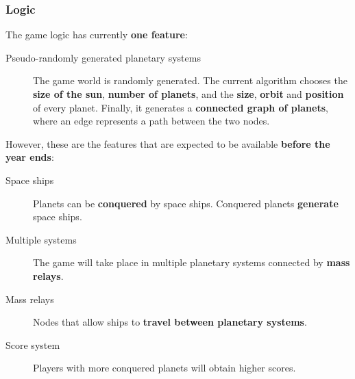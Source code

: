 \documentclass[a4paper,11pt]{article}
\begin{document}
\subsubsection{Logic}
\indent
The game logic has currently \textbf{one feature}:
\begin{description}
\item[Pseudo-randomly generated planetary systems]
The game world is randomly generated. The current algorithm
  chooses the \textbf{size of the sun}, \textbf{number of planets}, and the \textbf{size}, \textbf{orbit} and \textbf{position} of every planet.
  Finally, it generates a \textbf{connected graph of planets}, where an edge represents a path between the two nodes.
\end{description}
However, these are the features that are expected to be available \textbf{before the year ends}:
\begin{description}
\item[Space ships]
Planets can be \textbf{conquered} by space ships. Conquered planets \textbf{generate} space ships.
\item[Multiple systems]
The game will take place in multiple planetary systems connected by \textbf{mass relays}.
\item[Mass relays]
Nodes that allow ships to \textbf{travel between planetary systems}.
\item[Score system]
Players with more conquered planets will obtain higher scores.
\end{description}
\clearpage
\end{document}
